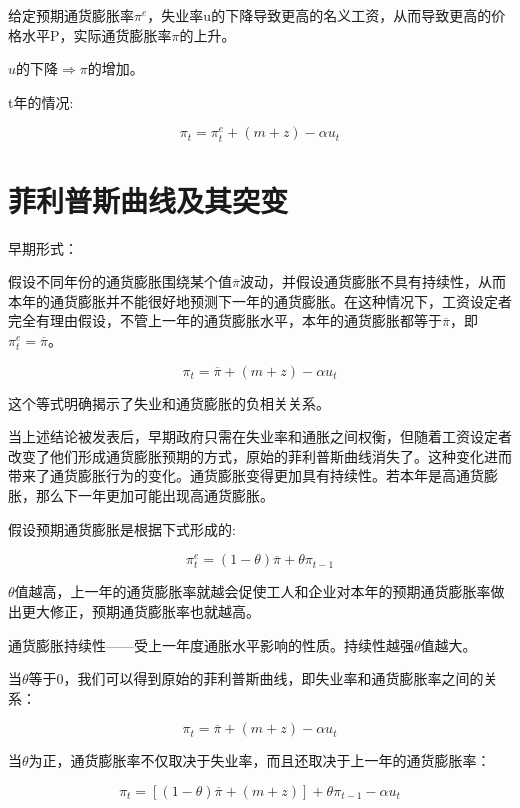 \documentclass{article}
\begin{document}
\hspace*{\fill}

给定预期通货膨胀率$ \pi^e $，失业率u的下降导致更高的名义工资，从而导致更高的价格水平P，实际通货膨胀率$ \pi $的上升。

$ u $的下降$ \Rightarrow\pi $的增加。

\hspace*{\fill}

t年的情况:

\[
\pi_t=\pi^e_t+(m+z)-\alpha u_t
\]

\section{菲利普斯曲线及其突变}

早期形式：

假设不同年份的通货膨胀围绕某个值$ \overline{\pi} $波动，并假设通货膨胀不具有持续性，从而本年的通货膨胀并不能很好地预测下一年的通货膨胀。在这种情况下，工资设定者完全有理由假设，不管上一年的通货膨胀水平，本年的通货膨胀都等于$ \overline{\pi} $，即$ \pi^e_t=\overline{\pi} $。

\[
\pi_t=\overline{\pi}+(m+z)-\alpha u_t
\]

这个等式明确揭示了失业和通货膨胀的负相关关系。

\hspace*{\fill}

当上述结论被发表后，早期政府只需在失业率和通胀之间权衡，但随着工资设定者改变了他们形成通货膨胀预期的方式，原始的菲利普斯曲线消失了。这种变化进而带来了通货膨胀行为的变化。通货膨胀变得更加具有持续性。若本年是高通货膨胀，那么下一年更加可能出现高通货膨胀。

假设预期通货膨胀是根据下式形成的:

\[
\pi^e_t=(1-\theta)\overline{\pi}+\theta\pi_{t-1}
\]

$ \theta $值越高，上一年的通货膨胀率就越会促使工人和企业对本年的预期通货膨胀率做出更大修正，预期通货膨胀率也就越高。

通货膨胀持续性——受上一年度通胀水平影响的性质。持续性越强$ \theta $值越大。

\hspace*{\fill}

当$ \theta $等于0，我们可以得到原始的菲利普斯曲线，即失业率和通货膨胀率之间的关系：

\[
\pi_t=\overline{\pi}+(m+z)-\alpha u_t
\]

当$ \theta $为正，通货膨胀率不仅取决于失业率，而且还取决于上一年的通货膨胀率：

\[
\pi_t=[(1-\theta)\overline{\pi}+(m+z)]+\theta\pi_{t-1}-\alpha u_t
\]
\end{document}
